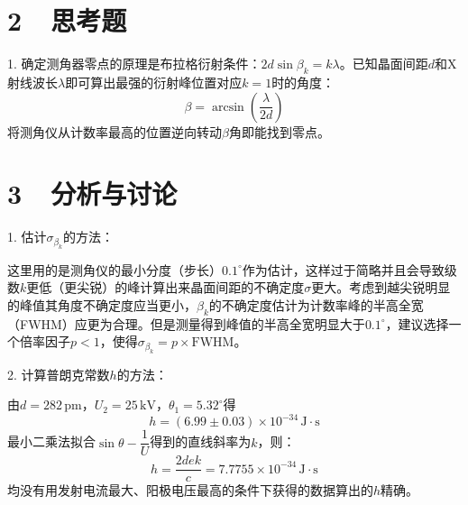 \documentclass[a4paper,fontset=windows]{ctexart}
\begin{document}
    \section*{2\ \ 思考题}
    
    1. 确定测角器零点的原理是布拉格衍射条件：$2d\sin\beta_k = k\lambda$。已知晶面间距$d$和X射线波长$\lambda$即可算出最强的衍射峰位置对应$k=1$时的角度：
    \[
    \beta = \arcsin\left(\frac{\lambda}{2d}\right)
    \]
    将测角仪从计数率最高的位置逆向转动$\beta$角即能找到零点。

    \section*{3\ \ 分析与讨论}
    
    1. 估计$\sigma_{\beta_k}$的方法：
    
    这里用的是测角仪的最小分度（步长）$0.1^\circ$作为估计，这样过于简略并且会导致级数$k$更低（更尖锐）的峰计算出来晶面间距的不确定度$\sigma$更大。考虑到越尖锐明显的峰值其角度不确定度应当更小，$\beta_k$的不确定度估计为计数率峰的半高全宽（FWHM）应更为合理。但是测量得到峰值的半高全宽明显大于$0.1^\circ$，建议选择一个倍率因子$p<1$，使得$\sigma_{\beta_k} = p \times \mathrm{FWHM}$。
    
    2. 计算普朗克常数$h$的方法：
    
    由$d = 282\,\mathrm{pm}$，$U_2 = 25\,\mathrm{kV}$，$\theta_1 = 5.32^\circ$得
    \[
    h = (6.99\pm0.03)\times10^{-34}\,\mathrm{J \cdot s}
    \]
    最小二乘法拟合$\sin\theta - \dfrac{1}{U}$得到的直线斜率为$k$，则：
    \[
    h = \frac{2dek}{c} = 7.7755\times10^{-34}\,\mathrm{J \cdot s}
    \]
    均没有用发射电流最大、阳极电压最高的条件下获得的数据算出的$h$精确。
\end{document}
